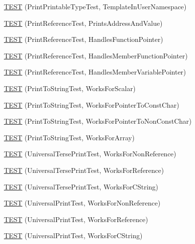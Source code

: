 \begin{DoxyCompactItemize}
\item 
\hyperlink{namespacetesting_1_1gtest__printers__test_aa697a3cf25b7f51f26ab49ed8ac3dd31}{\-T\-E\-S\-T} (\-Print\-Printable\-Type\-Test, \-Template\-In\-User\-Namespace)
\item 
\hyperlink{namespacetesting_1_1gtest__printers__test_aeae9b61a9fe582c72580db1466631846}{\-T\-E\-S\-T} (\-Print\-Reference\-Test, \-Prints\-Address\-And\-Value)
\item 
\hyperlink{namespacetesting_1_1gtest__printers__test_aab47074bb60b087e80675a44ad8c88ba}{\-T\-E\-S\-T} (\-Print\-Reference\-Test, \-Handles\-Function\-Pointer)
\item 
\hyperlink{namespacetesting_1_1gtest__printers__test_a88f9089e0b19be4bda74a953d6a47d7b}{\-T\-E\-S\-T} (\-Print\-Reference\-Test, \-Handles\-Member\-Function\-Pointer)
\item 
\hyperlink{namespacetesting_1_1gtest__printers__test_af9c63486049ac0ec2a1db65904702eb3}{\-T\-E\-S\-T} (\-Print\-Reference\-Test, \-Handles\-Member\-Variable\-Pointer)
\item 
\hyperlink{namespacetesting_1_1gtest__printers__test_a5d1bc4b12c18ccaec2ced9f45c092567}{\-T\-E\-S\-T} (\-Print\-To\-String\-Test, \-Works\-For\-Scalar)
\item 
\hyperlink{namespacetesting_1_1gtest__printers__test_a68100148758516ebab9c761ca7778586}{\-T\-E\-S\-T} (\-Print\-To\-String\-Test, \-Works\-For\-Pointer\-To\-Const\-Char)
\item 
\hyperlink{namespacetesting_1_1gtest__printers__test_a1db34d8760c17157572ce2877007d15a}{\-T\-E\-S\-T} (\-Print\-To\-String\-Test, \-Works\-For\-Pointer\-To\-Non\-Const\-Char)
\item 
\hyperlink{namespacetesting_1_1gtest__printers__test_a78bd89af8a8505880b78ec2a001d3cb8}{\-T\-E\-S\-T} (\-Print\-To\-String\-Test, \-Works\-For\-Array)
\item 
\hyperlink{namespacetesting_1_1gtest__printers__test_ab49ff6527b0b01411b725fe46e1af65c}{\-T\-E\-S\-T} (\-Universal\-Terse\-Print\-Test, \-Works\-For\-Non\-Reference)
\item 
\hyperlink{namespacetesting_1_1gtest__printers__test_ab7adb58a0e08e0830157a5a1c7bceac5}{\-T\-E\-S\-T} (\-Universal\-Terse\-Print\-Test, \-Works\-For\-Reference)
\item 
\hyperlink{namespacetesting_1_1gtest__printers__test_ab11252e228a240a349d747546bc222d2}{\-T\-E\-S\-T} (\-Universal\-Terse\-Print\-Test, \-Works\-For\-C\-String)
\item 
\hyperlink{namespacetesting_1_1gtest__printers__test_a43d4efc91c2ea7d8220891df9b0437df}{\-T\-E\-S\-T} (\-Universal\-Print\-Test, \-Works\-For\-Non\-Reference)
\item 
\hyperlink{namespacetesting_1_1gtest__printers__test_a58ad7c81884e852b09646764ce14a47e}{\-T\-E\-S\-T} (\-Universal\-Print\-Test, \-Works\-For\-Reference)
\item 
\hyperlink{namespacetesting_1_1gtest__printers__test_ac20aca012aca1ca9589dbf7483fbbbd1}{\-T\-E\-S\-T} (\-Universal\-Print\-Test, \-Works\-For\-C\-String)
\end{DoxyCompactItemize}


